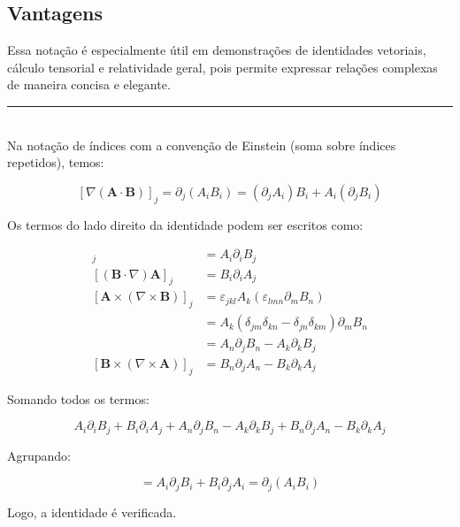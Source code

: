 \documentclass[a4paper,12pt]{article}
\begin{document}
\begin{flushleft}
\subsection*{Vantagens}

Essa notação é especialmente útil em demonstrações de identidades vetoriais, cálculo tensorial e 
relatividade geral, pois permite expressar relações complexas de maneira concisa e elegante.

\noindent\rule{\linewidth}{0.8pt}\\
Na notação de índices com a convenção de Einstein (soma sobre índices repetidos), temos:

\begin{equation}
\boxed{[\nabla(\mathbf{A} \cdot \mathbf{B})]_j = \partial_j (A_i B_i) = (\partial_j A_i) B_i + A_i (\partial_j B_i)}
\end{equation}

Os termos do lado direito da identidade podem ser escritos como:

\begin{align}
[(\mathbf{A} \cdot \nabla) \mathbf{B}]_j &= A_i \partial_i B_j \\
[(\mathbf{B} \cdot \nabla) \mathbf{A}]_j &= B_i \partial_i A_j \\
[\mathbf{A} \times (\nabla \times \mathbf{B})]_j &= \varepsilon_{jkl} A_k (\varepsilon_{lmn} \partial_m B_n) \nonumber \\
&= A_k (\delta_{jm} \delta_{kn} - \delta_{jn} \delta_{km}) \partial_m B_n \nonumber \\
&= A_n \partial_j B_n - A_k \partial_k B_j \\
[\mathbf{B} \times (\nabla \times \mathbf{A})]_j &= B_n \partial_j A_n - B_k \partial_k A_j
\end{align}

Somando todos os termos:

\begin{equation}
A_i \partial_i B_j + B_i \partial_i A_j + A_n \partial_j B_n - A_k \partial_k B_j + B_n \partial_j A_n - B_k \partial_k A_j
\end{equation}

Agrupando:

\begin{equation}
= A_i \partial_j B_i + B_i \partial_j A_i = \partial_j (A_i B_i)
\end{equation}
    
Logo, a identidade é verificada.
\end{flushleft}
\end{document}
